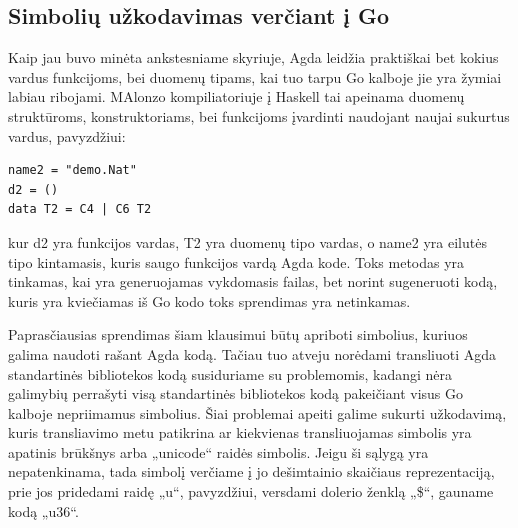 \documentclass{VUMIFPSkursinis}
\begin{document}
\subsection{Simbolių užkodavimas verčiant į Go}
Kaip jau buvo minėta ankstesniame skyriuje, Agda leidžia praktiškai bet kokius vardus funkcijoms, bei duomenų tipams, kai tuo tarpu Go kalboje jie yra žymiai labiau ribojami. MAlonzo kompiliatoriuje į Haskell tai apeinama duomenų struktūroms, konstruktoriams, bei funkcijoms įvardinti naudojant naujai sukurtus vardus, pavyzdžiui:
\begin{lstlisting}
name2 = "demo.Nat"
d2 = ()
data T2 = C4 | C6 T2
\end{lstlisting}
kur d2 yra funkcijos vardas, T2 yra duomenų tipo vardas, o name2 yra eilutės tipo kintamasis, kuris saugo funkcijos vardą Agda kode. Toks metodas yra tinkamas, kai yra generuojamas vykdomasis failas, bet norint sugeneruoti kodą, kuris yra kviečiamas iš Go kodo toks sprendimas yra netinkamas. \par Paprasčiausias sprendimas šiam klausimui būtų apriboti simbolius, kuriuos galima naudoti rašant Agda kodą. Tačiau tuo atveju norėdami transliuoti Agda standartinės bibliotekos kodą susiduriame su problemomis, kadangi nėra galimybių perrašyti visą standartinės bibliotekos kodą pakeičiant visus Go kalboje nepriimamus simbolius. Šiai problemai apeiti galime sukurti užkodavimą, kuris transliavimo metu patikrina ar kiekvienas transliuojamas simbolis yra apatinis brūkšnys arba „unicode“ raidės simbolis. Jeigu ši sąlygą yra nepatenkinama, tada simbolį verčiame į jo dešimtainio skaičiaus reprezentaciją, prie jos pridedami raidę „u“, pavyzdžiui, versdami dolerio ženklą „\$“, gauname kodą „u36“.
\end{document}
